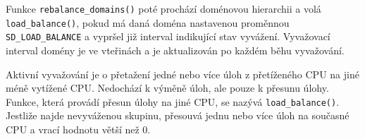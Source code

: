 \documentclass[
  field=ainfk,
  biblatex,
  glossaries,
  index
]{kidiplom}
\begin{document}
Funkce \verb#rebalance_domains()# poté prochází doménovou hierarchii a volá \verb#load_balance()#, pokud má daná doména nastavenou proměnnou \linebreak \verb#SD_LOAD_BALANCE# a vypršel již interval indikující stav vyvážení. Vyvažovací interval domény je ve vteřinách a je aktualizován po každém běhu vyvažování.

Aktivní vyvažování je o přetažení jedné nebo více úloh z přetíženého CPU na jiné méně vytížené CPU. Nedochází k výměně úloh, ale pouze k přesunu úlohy. Funkce, která provádí přesun úlohy na jiné CPU, se nazývá \verb#load_balance()#. Jestliže najde nevyváženou skupinu, přesouvá jednu nebo více úloh na současné CPU a vrací hodnotu větší než 0.

%
%
%
%
%
%
%
%
%
%
%
%
%
%
%
%
%
\end{document}
